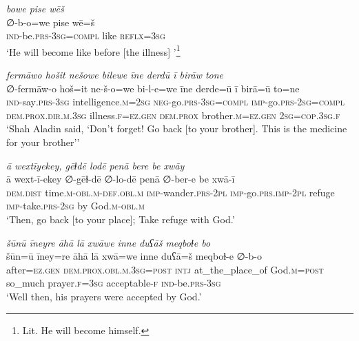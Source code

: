 \ea \label{DG.52}
\textit{bowe pise wēš} \\ 
\gll ∅-b-o=we pise wē=š \\ 
 \textsc{ind-}be\textsc{.prs}\textsc{-3sg}\textsc{=\textsc{compl}} like \textsc{reflx}\textsc{=3sg} \\ 
\glt `He will become like before [the illness] '\footnote{Lit. He will become himself.}
\z 
 
\ea \label{DG.56}
\textit{fermāwo hošit nešowe bilewe īne derdū ī birāw tone} \\ 
\gll ∅-fermāw-o hoš=it ne-š-o=we bi-l-e=we īne derde=ū ī birā=ū to=ne \\ 
 \textsc{ind-}say\textsc{.prs}\textsc{-3sg} intelligence\textsc{.m}\textsc{=\textsc{2sg}} \textsc{neg-}go\textsc{.prs}\textsc{-3sg}\textsc{=\textsc{compl}} \textsc{imp-}go\textsc{.prs}-\textsc{2sg}\textsc{=compl} \textsc{dem.prox}\textsc{.dir}\textsc{.m}\textsc{.3sg} illness\textsc{\textsc{.f}}\textsc{=ez}\textsc{.gen} \textsc{dem.prox} brother\textsc{.m}\textsc{=ez}\textsc{.gen} \textsc{2sg}\textsc{=cop}\textsc{.3sg}\textsc{\textsc{.f}} \\ 
\glt `Shah Aladin said, ‘Don’t forget! Go back [to your brother]. This is the medicine for your brother’'
\z 
 
\ea \label{DG.58}
\textit{ā wextīyekey, gēɫdē lodē penā bere be xwāy} \\ 
\gll ā wext-ī-ekey ∅-gēɫ-dē ∅-lo-dē penā ∅-ber-e be xwā-ī \\ 
 \textsc{dem.dist} time\textsc{.m}\textsc{-obl}\textsc{.m}\textsc{-def}\textsc{.obl}\textsc{.m} \textsc{imp-}wander\textsc{.prs}\textsc{-2pl} \textsc{imp-}go\textsc{.prs}\textsc{.imp}\textsc{-2pl} refuge \textsc{imp-}take\textsc{.prs}-\textsc{2sg} by God\textsc{.m}\textsc{-obl}\textsc{.m} \\ 
\glt `Then, go back [to your place]; Take refuge with God.'
\z 
 
\ea \label{DG.60}
\textit{šūnū īneyre āhā lā xwāwe inne duʕāš meqboɫe bo} \\ 
\gll šūn=ū īney=re āhā lā xwā=we inne duʕā=š meqboɫ-e ∅-b-o \\ 
 after\textsc{=ez}\textsc{.gen} \textsc{dem.prox}\textsc{.obl}\textsc{.m}\textsc{.3sg}\textsc{=\textsc{post}} \textsc{intj} at\_the\_place\_of God\textsc{.m}\textsc{=\textsc{post}} so\_much prayer\textsc{\textsc{.f}}\textsc{=3sg} acceptable\textsc{-f} \textsc{ind-}be\textsc{.prs}\textsc{-3sg} \\ 
\glt `Well then, his prayers were accepted by God.'
\z 
 
